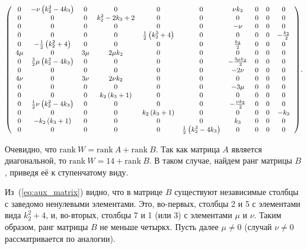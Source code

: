 \documentclass[../main.tex]{subfiles}
\begin{document}
\begin{equation}\label{eq:aux_matrix}
{\small\left(
\begin{array}{cccccccccc}
 0 & -\nu  \left(k_2^2-4 k_3\right) & 0 & 0 & 0 & 0 & \nu  k_2 & 0 & 0 & 0 \\
 0 & 0 & 0 & k_2^2-2 k_3+2 & 0 & 0 & 0 & 0 & 0 & 0 \\
 0 & 0 & 0 & 0 & 0 & 0 & -\nu  & 0 & 0 & 0 \\
 0 & 0 & 0 & 0 & \frac{1}{2} \left(k_2^2+4\right) & 0 & 0 & 0 & 0 & -\frac{k_2}{2} \\
 0 & -\frac{1}{2} \left(k_2^2+4\right) & 0 & 0 & 0 & 0 & \frac{k_2}{2} & 0 & 0 & 0 \\
 4 \mu  & 0 & 3 \mu  & 2 \mu  k_2 & 0 & 0 & 0 & 0 & 0 & 0 \\
 0 & \frac{3}{2} \mu  \left(k_2^2-4 k_3\right) & 0 & 0 & 0 & 0 & -\frac{3 \mu  k_2}{2} & 0 & 0 & 0 \\
 0 & 0 & 0 & 0 & 0 & 0 & -2 \nu  & 0 & 0 & 0 \\
 4 \nu  & 0 & 3 \nu  & 2 \nu  k_2 & 0 & 0 & 0 & 0 & 0 & 0 \\
 0 & 0 & 0 & 0 & 0 & 0 & -3 \mu  & 0 & 0 & 0 \\
 0 & 0 & 0 & k_2 \left(k_3+1\right) & 0 & 0 & 0 & 0 & 0 & 0 \\
 0 & \frac{1}{2} \nu  \left(k_2^2-4 k_3\right) & 0 & 0 & 0 & 0 & -\frac{\nu  k_2}{2} & 0 & 0 & 0 \\
 0 & 0 & 0 & 0 & k_2 \left(k_3+1\right) & 0 & 0 & 0 & 0 & -k_3 \\
 0 & -k_2 \left(k_3+1\right) & 0 & 0 & 0 & 0 & k_3 & 0 & 0 & 0 \\
 0 & 0 & 0 & 0 & 0 & \frac{1}{2} \left(k_2^2-4 k_3\right) & 0 & 0 & 0 & 0 \\
\end{array}
\right)}.
\end{equation}

Очевидно, что $\mathrm{rank}~W = \mathrm{rank}~A + \mathrm{rank}~B$. Так как матрица $A$ является диагональной, то $\mathrm{rank}~W = 14 + \mathrm{rank}~B$. В таком случае, найдем ранг матрицы $B$, приведя её к ступенчатому виду. 

Из~(\ref{eq:aux_matrix}) видно, что в матрице $B$ существуют независимые столбцы с заведомо ненулевыми элементами. Это, во-первых, столбцы 2 и 5 с элементами вида $k_2^2 + 4$, и, во-вторых, столбцы 7 и 1 (или 3) с элементами $\mu$ и $\nu$. Таким образом, ранг матрицы $B$ не меньше четыркх. Пусть далее $\mu \ne 0$ (случай $\nu \ne 0$ рассматривается по аналогии). 
\end{document}
